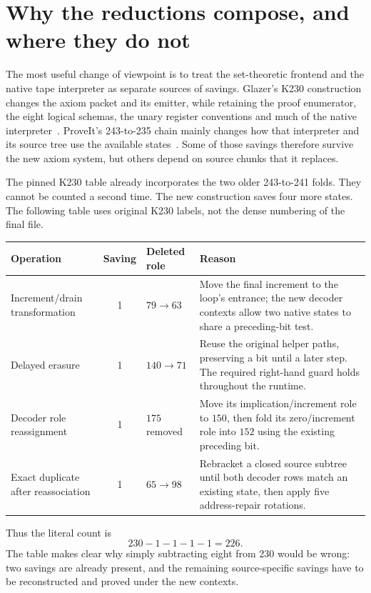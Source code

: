 \section{Why the reductions compose, and where they do not}
\label{sec:construction-overview}

The most useful change of viewpoint is to treat the set-theoretic frontend
and the native tape interpreter as separate sources of savings. Glazer's
K230 construction changes the axiom packet and its emitter, while retaining
the proof enumerator, the eight logical schemas, the unary register
conventions and much of the native interpreter~\cite{glazer}. ProveIt's
243-to-235 chain mainly changes how that interpreter and its source tree
use the available states~\cite{proveit235,proveit236}. Some of those savings
therefore survive the new axiom system, but others depend on source chunks
that it replaces.

The pinned K230 table already incorporates the two older 243-to-241
folds. They cannot be counted a second time. The new construction saves
four more states. The following table uses original K230 labels, not
the dense numbering of the final file.

\begin{center}\small
\begin{tabularx}{\linewidth}{@{}lclX@{}}\toprule
Operation & Saving & Deleted role & Reason\\\midrule
Increment/drain transformation & 1 & $79\to63$ &
Move the final increment to the loop's entrance; the new decoder contexts
allow two native states to share a preceding-bit test.\\
Delayed erasure & 1 & $140\to71$ &
Reuse the original helper paths, preserving a bit until a later step.
The required right-hand guard holds throughout the runtime.\\
Decoder role reassignment & 1 & $175$ removed &
Move its implication/increment role to $150$, then fold its zero/increment
role into $152$ using the existing preceding bit.\\
Exact duplicate after reassociation & 1 & $65\to98$ &
Rebracket a closed source subtree until both decoder rows match an
existing state, then apply five address-repair rotations.\\
\bottomrule\end{tabularx}
\end{center}

Thus the literal count is
\[
                 230-1-1-1-1=226.
\]
The table makes clear why simply subtracting eight from 230 would be wrong:
two savings are already present, and the remaining source-specific savings
have to be reconstructed and proved under the new contexts.

